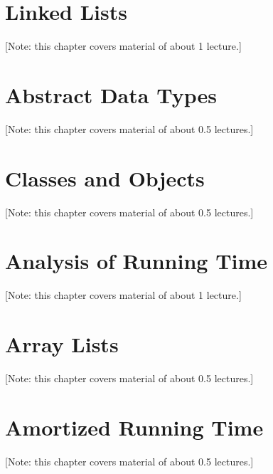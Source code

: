 \documentclass{book}
\begin{document}

% 

\chapter{Linked Lists}
\label{chap:linked-lists}
[Note: this chapter covers material of about 1 lecture.]


% 

\chapter{Abstract Data Types}
\label{chap:ADTs}
[Note: this chapter covers material of about 0.5 lectures.]



\chapter{Classes and Objects}
\label{chap:classes}
[Note: this chapter covers material of about 0.5 lectures.]



\chapter{Analysis of Running Time}
\label{chap:running-time}
[Note: this chapter covers material of about 1 lecture.]



\chapter{Array Lists}
\label{chap:arraylists}
[Note: this chapter covers material of about 0.5 lectures.]



\chapter{Amortized Running Time}
\label{chap:amortized}
[Note: this chapter covers material of about 0.5 lectures.]
\end{document}
